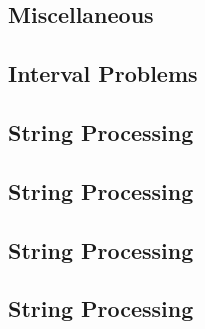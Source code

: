 \raggedbottom
\vspace{-.7\baselineskip}\hrulefill
\vspace{0.1\baselineskip}\subsection{Miscellaneous}
\raggedbottom
\vspace{-.7\baselineskip}\hrulefill
\vspace{0.1\baselineskip}\subsection{Interval Problems}
\raggedbottom
\vspace{-.7\baselineskip}\hrulefill
\vspace{0.1\baselineskip}\subsection{String Processing}
\raggedbottom
\vspace{-.7\baselineskip}\hrulefill
\vspace{0.1\baselineskip}\subsection{String Processing}
\raggedbottom
\vspace{-.7\baselineskip}\hrulefill
\vspace{0.1\baselineskip}\subsection{String Processing}
\raggedbottom
\vspace{-.7\baselineskip}\hrulefill
\vspace{0.1\baselineskip}\subsection{String Processing}
\raggedbottom
\vspace{-.7\baselineskip}\hrulefill
